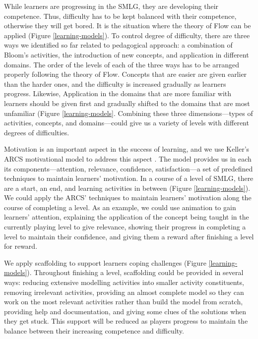 \documentclass[12pt, a4paper]{report}
\begin{document}
{While learners are progressing in the SMLG, they are developing their competence. Thus, difficulty has to be kept balanced with their competence, otherwise they will get bored. It is the situation where the theory of Flow can be applied (Figure \ref{learning-models}). To control degree of difficulty, there are three ways we identified so far related to pedagogical approach: a combination of Bloom's activities, the introduction of new concepts, and application in different domains. The order of the levels of each of the three ways has to be arranged properly following the theory of Flow. Concepts that are easier are given earlier than the harder ones, and the difficulty is increased gradually as learners progress. Likewise, Application in the domains that are more familiar with learners should be given first and gradually shifted to the domains that are most unfamiliar (Figure \ref{learning-models}. Combining these three dimensions---types of activities, concepts, and domains---could give us a variety of levels with different degrees of difficulties.

Motivation is an important aspect in the success of learning, and we use Keller's ARCS motivational model to address this aspect \cite{keller2010motivational}. The model provides us in each its components---attention, relevance, confidence, satisfaction---a set of predefined techniques to maintain learners' motivation. In a course of a level of SMLG, there are a start, an end, and learning activities in between (Figure \ref{learning-models}). We could apply the ARCS' techniques to maintain learners' motivation along the course of completing a level. As an example, we could use animation to gain learners' attention, explaining the application of the concept being taught in the currently playing level to give relevance, showing their progress in completing a level to maintain their confidence, and giving them a reward after finishing a level for reward.
 
We apply scaffolding \cite{vygotsky1978mind, wood1976role} to support learners coping challenges (Figure \ref{learning-models}). Throughout finishing a level, scaffolding could be provided in several ways: reducing extensive modelling activities into smaller activity constituents, removing irrelevant activities, providing an almost complete model so they can work on the most relevant activities rather than build the model from scratch, providing help and documentation, and giving some clues of the solutions when they get stuck. This support will be reduced as players progress to maintain the balance between their increasing competence and difficulty.

}
\end{document}
